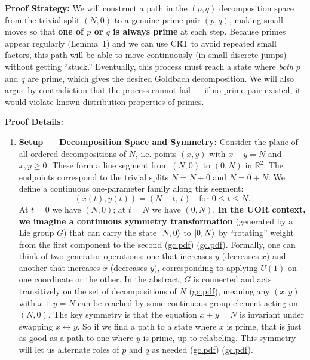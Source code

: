 \documentclass[12pt]{article}
\begin{document}
\textbf{Proof Strategy:} We will construct a path in the $(p,q)$ decomposition space from the trivial split $(N,0)$ to a genuine prime pair $(p,q)$, making small moves so that \textbf{one of $p$ or $q$ is always prime} at each step. Because primes appear regularly (Lemma~1) and we can use CRT to avoid repeated small factors, this path will be able to move continuously (in small discrete jumps) without getting “stuck.” Eventually, this process must reach a state where \emph{both} $p$ and $q$ are prime, which gives the desired Goldbach decomposition. We will also argue by contradiction that the process cannot fail --- if no prime pair existed, it would violate known distribution properties of primes.

\medskip

\textbf{Proof Details:}

\begin{enumerate}[leftmargin=*, label=\arabic*.]
  \item \textbf{Setup --- Decomposition Space and Symmetry:} Consider the plane of all ordered decompositions of $N$, i.e. points $(x,y)$ with $x+y=N$ and $x,y\ge 0$. These form a line segment from $(N,0)$ to $(0,N)$ in $\mathbb{R}^2$. The endpoints correspond to the trivial splits $N= N+0$ and $N=0+N$. We define a continuous one-parameter family along this segment:
  \[
  (x(t),y(t)) = (N-t,\,t) \quad \text{for } 0\le t\le N.
  \]
  At $t=0$ we have $(N,0)$; at $t=N$ we have $(0,N)$. \textbf{In the UOR context, we imagine a continuous symmetry transformation} (generated by a Lie group $G$) that can carry the state $\ket{N,0}$ to $\ket{0,N}$ by “rotating” weight from the first component to the second (\href{file://file-7ZYYwSHWVa83XEVTrEhg5z#:~:text=proof%20is%20as%20follows%3A%20We,dimensional}{gc.pdf}) (\href{file://file-7ZYYwSHWVa83XEVTrEhg5z#:~:text=action%20,such%20that%20at%20every}{gc.pdf}). Formally, one can think of two generator operations: one that increases $y$ (decreases $x$) and another that increases $x$ (decreases $y$), corresponding to applying $U(1)$ on one coordinate or the other. In the abstract, $G$ is connected and acts transitively on the set of decompositions of $N$ (\href{file://file-7ZYYwSHWVa83XEVTrEhg5z#:~:text=Proposition%201%20,Since%20primes%20are}{gc.pdf}), meaning any $(x,y)$ with $x+y=N$ can be reached by some continuous group element acting on $(N,0)$. The key symmetry is that the equation $x+y=N$ is invariant under swapping $x\leftrightarrow y$. So if we find a path to a state where $x$ is prime, that is just as good as a path to one where $y$ is prime, up to relabeling. This symmetry will let us alternate roles of $p$ and $q$ as needed (\href{file://file-7ZYYwSHWVa83XEVTrEhg5z#:~:text=%24,over%20short%20intervals%2C%20we%20expect}{gc.pdf}) (\href{file://file-7ZYYwSHWVa83XEVTrEhg5z#:~:text=prime%E2%80%93prime%20pair%20exists,via%20small}{gc.pdf}).


\end{enumerate}
\end{document}
